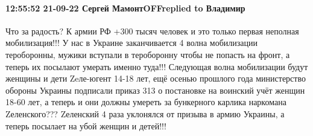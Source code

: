  
 
 
 
 

\paragraph{12:55:52 21-09-22 Сергей МамонтOFFreplied to Владимир}

Что за радость? К армии РФ +300 тысяч человек и это только первая неполная
мобилизация!!! У нас в Украине заканчивается 4 волна мобилизации тероборонны,
мужики вступали в тероборонну чтобы не попасть на фронт, а теперь их посылают
умерать именно туда!!! Следующая волна мобилизации будут женщины и дети
Zeле-югент 14-18 лет, ещё осенью прошлого года министерство обороны Украины
подписали приказ 313 о постановке на воинский учёт женщин 18-60 лет, а теперь и
они должны умереть за бункерного карлика наркомана Zеленского??? Zеленский 4
раза уклонялся от призыва в армию Украины, а теперь посылает на убой женщин и
детей!!!
